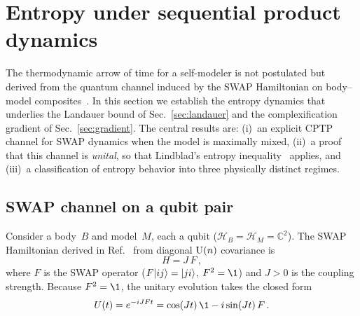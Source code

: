 
\section{Entropy under sequential product dynamics}\label{sec:entropy}

The thermodynamic arrow of time for a self-modeler is not postulated
but derived from the quantum channel induced by the SWAP Hamiltonian
on body--model composites~\cite{Paper5,Paper6}.  In this section we
establish the entropy dynamics that underlies the Landauer bound
of Sec.~\ref{sec:landauer} and the complexification gradient of
Sec.~\ref{sec:gradient}.  The central results are:
(i)~an explicit CPTP channel for SWAP dynamics when the model is
maximally mixed,
(ii)~a proof that this channel is \emph{unital}, so that Lindblad's
entropy inequality~\cite{Lindblad1975} applies, and
(iii)~a classification of entropy behavior into three physically
distinct regimes.

\subsection{SWAP channel on a qubit pair}\label{sec:swap-channel}

Consider a body~$B$ and model~$M$, each a qubit
($\mathcal{H}_B = \mathcal{H}_M = \mathbb{C}^2$).  The SWAP
Hamiltonian derived in Ref.~\cite{Paper6} from diagonal $\mathrm{U}(n)$
covariance is
\begin{equation}
  H = J\, F \,,
  \label{eq:swap-hamiltonian}
\end{equation}
where $F$ is the SWAP operator ($F| ij \rangle = | ji \rangle$, $F^2 = \1$)
and $J > 0$ is the coupling strength.  Because $F^2 = \1$, the
unitary evolution takes the closed form
\begin{equation}
  U(t) = e^{-i J F t} = \cos(Jt)\,\1 - i\sin(Jt)\, F \,.
  \label{eq:unitary}
\end{equation}

